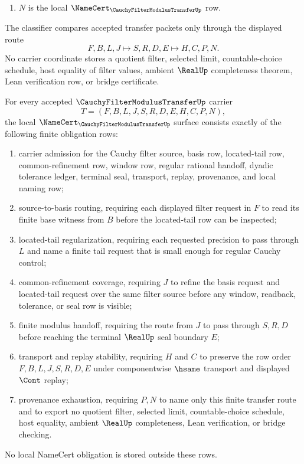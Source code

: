 \begin{definition}
\begin{enumerate}
\item $N$ is the local $\NameCert_{\CauchyFilterModulusTransferUp}$ row.
\end{enumerate}
The classifier compares accepted transfer packets only through the displayed route
$$
F,B,L,J \longmapsto S,R,D,E \longmapsto H,C,P,N .
$$
No carrier coordinate stores a quotient filter, selected limit, countable-choice schedule, host equality of filter values, ambient $\RealUp$ completeness theorem, Lean verification row, or bridge certificate.
\end{definition}

\begin{theorem}
\label{thm:cauchy-filter-modulus-transfer-namecert-obligations}
For every accepted $\CauchyFilterModulusTransferUp$ carrier
$$
T=(F,B,L,J,S,R,D,E,H,C,P,N),
$$
the local $\NameCert_{\CauchyFilterModulusTransferUp}$ surface consists exactly of the following finite obligation rows:
\begin{enumerate}
\item carrier admission for the Cauchy filter source, basis row, located-tail row, common-refinement row, window row, regular rational handoff, dyadic tolerance ledger, terminal seal, transport, replay, provenance, and local naming row;
\item source-to-basis routing, requiring each displayed filter request in $F$ to read its finite base witness from $B$ before the located-tail row can be inspected;
\item located-tail regularization, requiring each requested precision to pass through $L$ and name a finite tail request that is small enough for regular Cauchy control;
\item common-refinement coverage, requiring $J$ to refine the basis request and located-tail request over the same filter source before any window, readback, tolerance, or seal row is visible;
\item finite modulus handoff, requiring the route from $J$ to pass through $S,R,D$ before reaching the terminal $\RealUp$ seal boundary $E$;
\item transport and replay stability, requiring $H$ and $C$ to preserve the row order $F,B,L,J,S,R,D,E$ under componentwise $\hsame$ transport and displayed $\Cont$ replay;
\item provenance exhaustion, requiring $P,N$ to name only this finite transfer route and to export no quotient filter, selected limit, countable-choice schedule, host equality, ambient $\RealUp$ completeness, Lean verification, or bridge checking.
\end{enumerate}
No local NameCert obligation is stored outside these rows.
\end{theorem}
